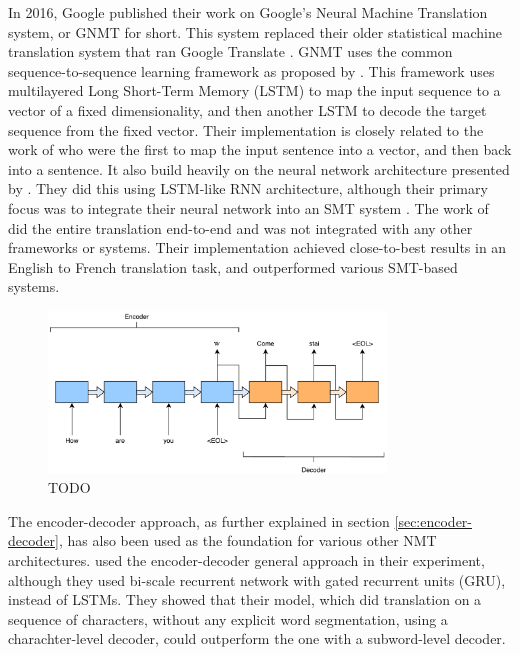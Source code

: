 In 2016, Google published their work on Google's Neural Machine Translation system, or GNMT for short. This system replaced their older statistical machine translation system that ran Google Translate \citep{turovsky2016googletranslatenmt}. GNMT uses the common sequence-to-sequence learning framework as proposed by \citep{sutskever2014sequence, wu2016google}. This framework uses multilayered Long Short-Term Memory (LSTM) to map the input sequence to a vector of a fixed dimensionality, and then another LSTM to decode the target sequence from the fixed vector. Their implementation is closely related to the work of \citep{kalchbrenner2013recurrent} who were the first to map the input sentence into a vector, and then back into a sentence. It also build heavily on the neural network architecture presented by \citep{cho2014learning}. They did this using LSTM-like RNN architecture, although their primary focus was to integrate their neural network into an SMT system \citep{cho2014learning, sutskever2014sequence}. The work of \citep{sutskever2014sequence} did the entire translation end-to-end and was not integrated with any other frameworks or systems. Their implementation achieved close-to-best results in an English to French translation task, and outperformed various SMT-based systems.

\begin{figure}[ht]
    \centering
    \includegraphics[width=0.8\textwidth]{fig/related_work/encoder_decoder_en_it.pdf}
    \caption{TODO}
    \label{fig:machine-translation-encoder-decoder-simple}
\end{figure}

The encoder-decoder approach, as further explained in section \ref{sec:encoder-decoder}, has also been used as the foundation for various other NMT architectures. \citep{chung2016character} used the encoder-decoder general approach in their experiment, although they used bi-scale recurrent network with gated recurrent units (GRU), instead of LSTMs. They showed that their model, which did translation on a sequence of characters, without any explicit word segmentation, using a charachter-level decoder, could outperform the one with a subword-level decoder.

